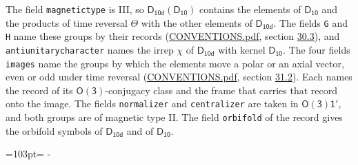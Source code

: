 \documentclass[10pt,a4paper]{article}
\newcommand{\needspace}[1]{\par\penalty-100\begingroup\dimen0=#1\relax\dimen2=\pagegoal
  \advance\dimen2-\pagetotal\ifdim\dimen0>\dimen2\relax\ifdim\dimen2>0pt\vfil\break\fi\fi
  \endgroup}
\numberwithin{equation}{section}
\newcommand{\grp}[1]{\mathsf{#1}}
\begin{document}
The field \texttt{magnetictype} is III, so $\grp{D_{10d}}(\grp{D_{10}})$ contains the elements of $\grp{D_{10}}$ and the products of time reversal $\varTheta$ with the other elements of $\grp{D_{10d}}$. The fields \texttt{G} and \texttt{H} name these groups by their records (\href{../../CONVENTIONS.pdf}{CONVENTIONS.pdf}, section \href{../../CONVENTIONS.pdf\#conv.30.3}{30.3}), and \texttt{antiunitarycharacter} names the irrep $\chi$ of $\grp{D_{10d}}$ with kernel $\grp{D_{10}}$. The four fields \texttt{images} name the groups by which the elements move a polar or an axial vector, even or odd under time reversal (\href{../../CONVENTIONS.pdf}{CONVENTIONS.pdf}, section \href{../../CONVENTIONS.pdf\#conv.31.2}{31.2}). Each names the record of its $\grp{O(3)}$-conjugacy class and the frame that carries that record onto the image. The fields \texttt{normalizer} and \texttt{centralizer} are taken in $\grp{O(3)1'}$, and both groups are of magnetic type II. The field \texttt{orbifold} of the record gives the orbifold symbols of $\grp{D_{10d}}$ and of $\grp{D_{10}}$.
\needspace{103pt}
\end{document}
